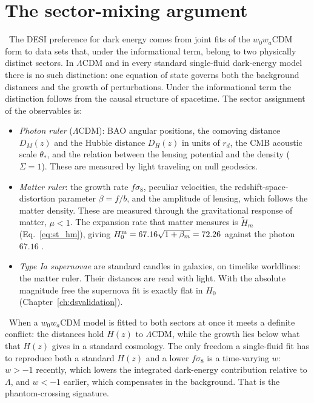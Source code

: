 \section{The sector-mixing argument}\label{sec:ph_mixing}
\conjecture\ The DESI preference for dark energy comes from joint fits of the $w_0w_a$CDM form to data sets that, under the informational term,
belong to two physically distinct sectors. In $\Lambda$CDM and in every standard single-fluid dark-energy model there is no such distinction: one
equation of state governs both the background distances and the growth of perturbations. Under the informational term the distinction follows from the
causal structure of spacetime. The sector assignment of the observables is:
\begin{itemize}
\item \emph{Photon ruler} ($\Lambda$CDM): BAO angular positions, the comoving distance $D_M(z)$ and the Hubble distance $D_H(z)$ in units of $r_d$, the
CMB acoustic scale $\theta_*$, and the relation between the lensing potential and the density ($\Sigma=1$). These are measured by light traveling on null
geodesics.
\item \emph{Matter ruler}: the growth rate $f\sigma_8$, peculiar velocities, the redshift-space-distortion parameter $\beta=f/b$, and the amplitude of
lensing, which follows the matter density. These are measured through the gravitational response of matter, $\mu<1$. The expansion rate that matter
measures is $\tilde H_m$ (Eq.~\ref{eq:st_hm}), giving $H_0^{\rm m}=67.16\sqrt{1+\beta_m}=72.26$ against the photon $67.16$ \calc.
\item \emph{Type Ia supernovae} are standard candles in galaxies, on timelike worldlines: the matter ruler. Their distances are read with light. With
the absolute magnitude free the supernova fit is exactly flat in $H_0$ (Chapter~\ref{ch:dsvalidation}).
\end{itemize}
\conjecture\ When a $w_0w_a$CDM model is fitted to both sectors at once it meets a definite conflict: the distances hold $H(z)$ to $\Lambda$CDM, while
the growth lies below what that $H(z)$ gives in a standard cosmology. The only freedom a single-fluid fit has to reproduce both a standard $H(z)$ and a
lower $f\sigma_8$ is a time-varying $w$: $w>-1$ recently, which lowers the integrated dark-energy contribution relative to $\Lambda$, and $w<-1$ earlier,
which compensates in the background. That is the phantom-crossing signature.

